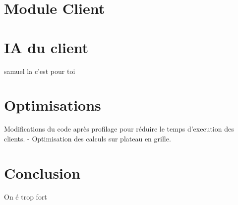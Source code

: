 \documentclass{article}
\begin{document}
\section{Module Client}
\section{IA du client}
samuel la c'est pour toi

\section{Optimisations}
Modifications du code après profilage pour réduire le temps 
d'execution des clients.
- Optimisation des calculs sur plateau en grille.


\section{Conclusion}
On é trop fort
\end{document}
